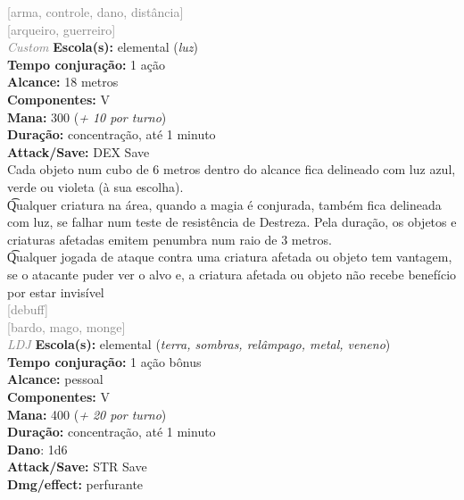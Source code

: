 \documentclass{RPG_Adventure}[2021/10/20]
\begin{document}
{\scriptsize \textcolor{gray}{[arma, controle, dano, distância]\\}}
{\scriptsize \textcolor{gray}{[arqueiro, guerreiro]\\}}
{\tiny \textcolor{gray}{\textit{Custom}}}
{\small \t \textbf{Escola(s):} elemental (\textit{luz})\\\t \textbf{Tempo conjuração:} 1 ação\\\t \textbf{Alcance:} 18 metros\\\t \textbf{Componentes:} V\\\t \textbf{Mana:} 300 (\textit{+ 10 por turno})\\\t \textbf{Duração:} concentração, até 1 minuto\\\t \textbf{Attack/Save:} DEX Save\\}
{\normalsize Cada objeto num cubo de 6 metros dentro do alcance fica delineado com luz azul, verde ou violeta (à sua escolha).\\\t Qualquer criatura na área, quando a magia é conjurada, também fica delineada com luz, se falhar num teste de resistência de Destreza. Pela duração, os objetos e criaturas afetadas emitem penumbra num raio de 3 metros.\\\t Qualquer jogada de ataque contra uma criatura afetada ou objeto tem vantagem, se o atacante puder ver o alvo e, a criatura afetada ou objeto não recebe benefício por estar invisível\\}
{\scriptsize \textcolor{gray}{[debuff]\\}}
{\scriptsize \textcolor{gray}{[bardo, mago, monge]\\}}
{\tiny \textcolor{gray}{\textit{LDJ}}}
{\small \t \textbf{Escola(s):} elemental (\textit{terra, sombras, relâmpago, metal, veneno})\\\t \textbf{Tempo conjuração:} 1 ação bônus\\\t \textbf{Alcance:} pessoal\\\t \textbf{Componentes:} V\\\t \textbf{Mana:} 400 (\textit{+ 20 por turno})\\\t \textbf{Duração:} concentração, até 1 minuto\\\t \textbf{Dano}: 1d6\\\t \textbf{Attack/Save:} STR Save\\\t \textbf{Dmg/effect:} perfurante\\}
\end{document}
